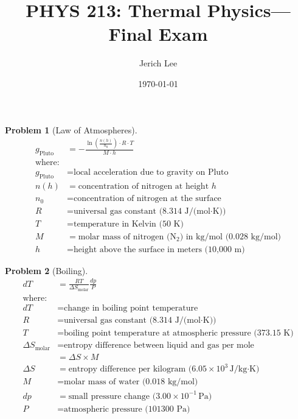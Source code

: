 \documentclass[12pt]{article}
\title{PHYS 213: Thermal Physics—Final Exam}
\author{Jerich Lee}
\date{\today}
\theoremstyle{definition} %
\newtheorem{problem}{Problem}
\theoremstyle{plain} %
\begin{document}
\maketitle
\begin{problem}[Law of Atmospheres]
    \noindent 
    \begin{align*}
        g_{\text{Pluto}} &= -\frac{\ln\left(\frac{n(h)}{n_0}\right) \cdot R \cdot T}{M \cdot h} \\
        \text{where:} \\
        g_{\text{Pluto}} &= \text{local acceleration due to gravity on Pluto} \\
        n(h) &= \text{concentration of nitrogen at height } h \\
        n_0 &= \text{concentration of nitrogen at the surface} \\
        R &= \text{universal gas constant (8.314 J/(mol·K))} \\
        T &= \text{temperature in Kelvin (50 K)} \\
        M &= \text{molar mass of nitrogen (} \text{N}_2 \text{) in kg/mol (0.028 kg/mol)} \\
        h &= \text{height above the surface in meters (10,000 m)}
        \end{align*}
\end{problem}
\begin{problem}[Boiling]
    \noindent 
    \begin{align*}
        dT &= \frac{R T}{\Delta S_{\text{molar}}} \frac{dp}{P} \\
        \text{where:} \\
        dT &= \text{change in boiling point temperature} \\
        R &= \text{universal gas constant (8.314 J/(mol·K))} \\
        T &= \text{boiling point temperature at atmospheric pressure (373.15 K)} \\
        \Delta S_{\text{molar}} &= \text{entropy difference between liquid and gas per mole} \\
        &= \Delta S \times M \\
        \Delta S &= \text{entropy difference per kilogram (6.05} \times 10^3 \, \text{J/kg·K)} \\
        M &= \text{molar mass of water (0.018 kg/mol)} \\
        dp &= \text{small pressure change (3.00} \times 10^{-1} \, \text{Pa)} \\
        P &= \text{atmospheric pressure (101300 Pa)}
        \end{align*}
\end{problem}
\end{document}
